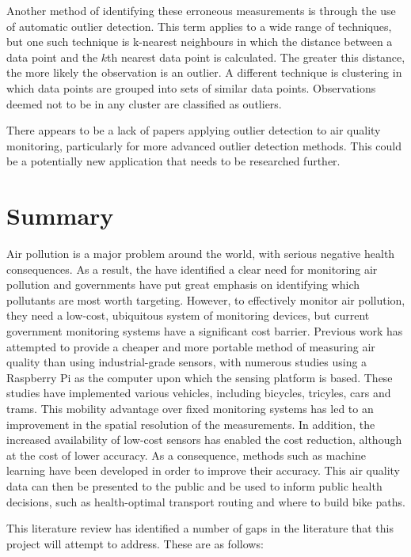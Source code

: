 \documentclass[11pt]{report}
\begin{document}
Another method of identifying these erroneous measurements is through the use of automatic outlier detection. This term applies to a wide range of techniques, but one such technique is k-nearest neighbours in which the distance between a data point and the $k$th nearest data point is calculated. The greater this distance, the more likely the observation is an outlier. A different technique is clustering in which data points are grouped into sets of similar data points. Observations deemed not to be in any cluster are classified as outliers.

There appears to be a lack of papers applying outlier detection to air quality monitoring, particularly for more advanced outlier detection methods. This could be a potentially new application that needs to be researched further.



\section{Summary}

Air pollution is a major problem around the world, with serious negative health consequences. As a result, the \cite{WHO2002ambientmonitoring} have identified a clear need for monitoring air pollution and governments have put great emphasis on identifying which pollutants are most worth targeting. However, to effectively monitor air pollution, they need a low-cost, ubiquitous system of monitoring devices, but current government monitoring systems have a significant cost barrier. Previous work has attempted to provide a cheaper and more portable method of measuring air quality than using industrial-grade sensors, with numerous studies using a Raspberry Pi as the computer upon which the sensing platform is based. These studies have implemented various vehicles, including bicycles, tricyles, cars and trams. This mobility advantage over fixed monitoring systems has led to an improvement in the spatial resolution of the measurements. In addition, the increased availability of low-cost sensors has enabled the cost reduction, although at the cost of lower accuracy. As a consequence, methods such as machine learning have been developed in order to improve their accuracy. This air quality data can then be presented to the public and be used to inform public health decisions, such as health-optimal transport routing and where to build bike paths.

This literature review has identified a number of gaps in the literature that this project will attempt to address. These are as follows:
\end{document}
